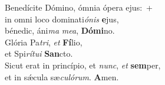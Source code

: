 \evenverse Benedícite Dómino, ómnia ópera ejus:~+\\
\evenverse  in omni loco dominati\textit{ó}\textit{nis} \textbf{e}jus,~\*\\
\evenverse bénedic, áni\textit{ma} \textit{me}\textit{a}, \textbf{Dó}\textbf{mi}no.\\
\oddverse Glória Pa\textit{tri}, \textit{et} \textbf{Fí}lio,~\*\\
\oddverse et Spi\textit{rí}\textit{tu}\textit{i} \textbf{San}cto.\\
\evenverse Sicut erat in princípio, et \textit{nunc}, \textit{et} \textbf{sem}per,~\*\\
\evenverse et in sǽcula sæ\textit{cu}\textit{ló}\textit{rum}. \textbf{A}men.\\
